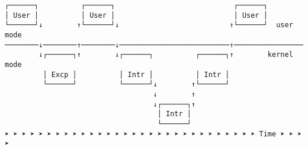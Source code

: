 \documentclass[varwidth=55em]{standalone}
\begin{document}
\begin{verbatim}
┌──────┐          ┌──────┐                            ┌──────┐
│ User │          │ User │                            │ User │
└──────┘↓        ↑└──────┘↓                          ↑└──────┘  user mode
────────↓────────↑────────↓──────────────────────────↑───────────────────
        ↓┌──────┐↑        ↓┌──────┐          ┌──────┐↑        kernel mode
         │ Excp │          │ Intr │          │ Intr │
         └──────┘          └──────┘↓        ↑└──────┘
                                   ↓        ↑
                                   ↓┌──────┐↑
                                    │ Intr │
                                    └──────┘
➤ ➤ ➤ ➤ ➤ ➤ ➤ ➤ ➤ ➤ ➤ ➤ ➤ ➤ ➤ ➤ ➤ ➤ ➤ ➤ ➤ ➤ ➤ ➤ ➤ ➤ ➤ ➤ ➤ ➤ Time ➤ ➤ ➤ ➤
\end{verbatim}
\end{document}
